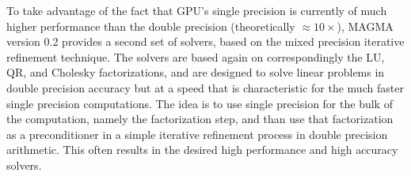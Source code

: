 \documentclass[10pt]{book}
\begin{document}
\vspace{0.1in}
To take advantage of the fact that GPU's single precision is currently 
of much higher performance than the double precision (theoretically
$\approx 10 \times$), MAGMA version 0.2 provides a second set of solvers,
based on the mixed precision iterative refinement technique.
The solvers are based again on correspondingly the LU, QR, and Cholesky
factorizations, and are designed to solve linear problems in double 
precision accuracy but at a speed that is characteristic for the much 
faster single precision computations. 
The idea is to use single precision for the bulk of the computation, 
namely the factorization step, and than use that factorization 
as a preconditioner in a simple iterative refinement process in double 
precision arithmetic. This often results in the desired high performance
and high accuracy solvers.



\footnotesize
\newpage
\end{document}
